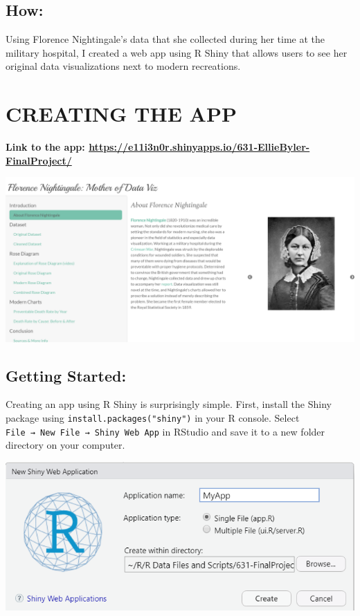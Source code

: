 \documentclass[
  dvipsnames]{article}
\begin{document}
\hypertarget{section-3}{%
\subsection{\texorpdfstring{\textcolor{TealBlue}{How:}}{}}\label{section-3}}

Using Florence Nightingale's data that she collected during her time at
the military hospital, I created a web app using R Shiny that allows
users to see her original data visualizations next to modern
recreations.

\newpage

\hypertarget{section-4}{%
\section{\texorpdfstring{\textcolor{WildStrawberry}{CREATING THE APP}}{}}\label{section-4}}

\textbf{Link to the app:
\url{https://e11i3n0r.shinyapps.io/631-EllieByler-FinalProject/}}

\begin{center}\includegraphics[width=1\linewidth]{app_landing_page} \end{center}

\hypertarget{section-5}{%
\subsection{\texorpdfstring{\textcolor{TealBlue}{Getting Started:}}{}}\label{section-5}}

Creating an app using R Shiny is surprisingly simple. First, install the
Shiny package using \texttt{install.packages("shiny")} in your R
console. Select \texttt{File\ →\ New\ File\ →\ Shiny\ Web\ App} in
RStudio and save it to a new folder directory on your computer.

\begin{center}\includegraphics[width=0.6\linewidth]{app_create_new} \end{center}
\end{document}
